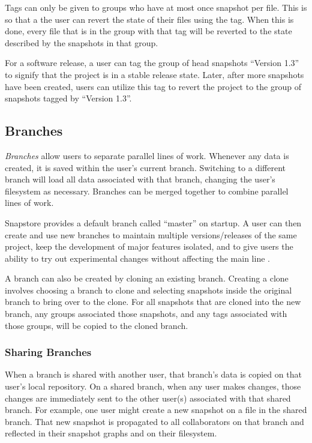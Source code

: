 Tags can only be given to groups who have at most once snapshot per file. This is so that a the user can revert the state of their files using the tag. When this is done, every file that is in the group with that tag will be reverted to the state described by the snapshots in that group.

For a software release, a user can tag the group of head snapshots ``Version 1.3'' to signify that the project is in a stable release state. Later, after more snapshots have been created, users can utilize this tag to revert the project to the group of snapshots tagged by ``Version 1.3''.

\subsection{Branches}

\textit{Branches} allow users to separate parallel lines of work. Whenever any data is created, it is saved within the user's current branch. Switching to a different branch will load all data associated with that branch, changing the user's filesystem as necessary. Branches can be merged together to combine parallel lines of work.

Snapstore provides a default branch called ``master'' on startup. A user can then create and use new branches to maintain multiple versions/releases of the same project, keep the development of major features isolated, and to give users the ability to try out experimental changes without affecting the main line \cite{RossoJackson}.

A branch can also be created by cloning an existing branch. Creating a clone involves choosing a branch to clone and selecting snapshots inside the original branch to bring over to the clone. For all snapshots that are cloned into the new branch, any groups associated those snapshots, and any tags associated with those groups, will be copied to the cloned branch.

\subsubsection{Sharing Branches}

When a branch is shared with another user, that branch's data is copied on that user's local repository. On a shared branch, when any user makes changes, those changes are immediately sent to the other user(s) associated with that shared branch. For example, one user might create a new snapshot on a file in the shared branch. That new snapshot is propagated to all collaborators on that branch and reflected in their snapshot graphs and on their filesystem.

